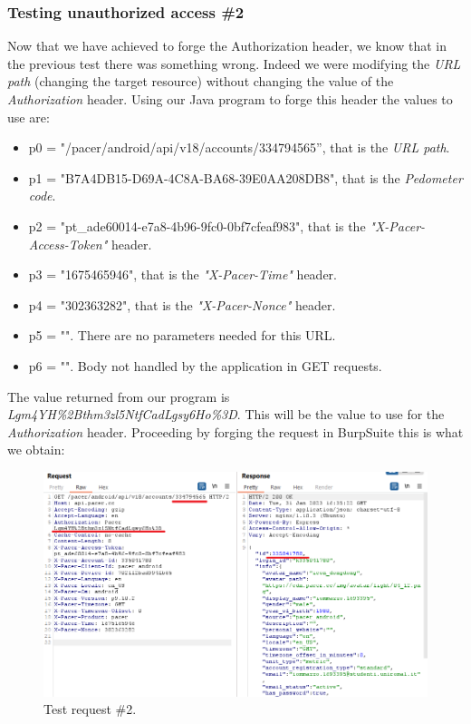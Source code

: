 		\subsubsection{Testing unauthorized access \#2}
			\par Now that we have achieved to forge the Authorization header, we know that in the previous test there was something wrong. Indeed we were modifying the \textit{URL path} (changing the target resource) without changing the value of the \textit{Authorization} header. Using our Java program to forge this header the values to use are:
			\begin{itemize}
				\item p0 = "/pacer/android/api/v18/accounts/334794565'', that is the \textit{URL path}.
				\item p1 = "B7A4DB15-D69A-4C8A-BA68-39E0AA208DB8", that is the \textit{Pedometer code}.
				\item p2 = "pt\_ade60014-e7a8-4b96-9fc0-0bf7cfeaf983", that is the \textit{"X-Pacer-Access-Token"} header.
				\item p3 = "1675465946", that is the \textit{"X-Pacer-Time"} header.
				\item p4 = "302363282", that is the \textit{"X-Pacer-Nonce"} header.
				\item p5 = "". There are no parameters needed for this URL.
				\item p6 = "". Body not handled by the application in GET requests.
			\end{itemize}
			The value returned from our program is \textit{Lgm4YH\%2Bthm3zl5NtfCadLgsy6Ho\%3D}. This will be the value to use for the \textit{Authorization} header.\newline
			Proceeding by forging the request in BurpSuite this is what we obtain:
			\begin{figure}[ht]
				\centering
				\includegraphics[width=\textwidth]{images/pacer3.png}
				\caption{Test request \#2.}
			\end{figure}
